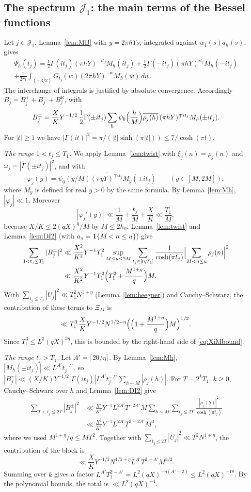 \documentclass[11pt]{amsart}
\theoremstyle{remark}
\theoremstyle{definition}
\numberwithin{equation}{section}
\newcommand{\Jc}{\mathcal{J}}
\newcommand{\one}{\mathbf{1}}
\begin{document}
\subsection{The spectrum \texorpdfstring{$\Jc_1$}{J\_1}: the main terms of the Bessel functions}\label{sec:J1main}
Let $j\in\Jc_1$. Lemma~\ref{lem:MB} with $y=2\pi hYs$, integrated against $w_1(s)a_h(s)$, gives
\begin{multline*}
\Psi_h(t_j)=\frac12\Gamma(it_j)(\pi hY)^{-it_j}M_h(it_j)+\frac12\Gamma(-it_j)(\pi hY)^{it_j}M_h(-it_j)\\
+\frac1{2\pi i}\int_{(-3/2)}G_{t_j}(w)(2\pi hY)^{-w}M_h(w)\,dw.
\end{multline*}
The interchange of integrals is justified by absolute convergence. Accordingly $B_j=B_j^++B_j^-+B_j^{\mathrm R}$, with
\[
B_j^\pm=\frac XKY^{-1/2}\,\frac12\Gamma(\pm it_j)\sum_h\psi_0\Bigl(\frac hM\Bigr)\overline{\rho_j(h)}\,(\pi hY)^{\mp it_j}M_h(\pm it_j).
\]
For $|t|\ge1$ we have $|\Gamma(it)|^2=\pi/(|t|\sinh(\pi|t|))\le7/\cosh(\pi t)$.

\emph{The range $1<t_j\le T_1$.} We apply Lemma~\ref{lem:twist} with $\xi_j(n)=\rho_j(n)$ and $\omega_j=|\Gamma(\pm it_j)|^2$, and with
\[
\varphi_j(y)=\overline{\psi_0(y/M)(\pi yY)^{\mp it_j}M_y(\pm it_j)}\qquad(y\in[M,2M]),
\]
where $M_y$ is defined for real $y>0$ by the same formula. By Lemma~\ref{lem:Mh}, $|\varphi_j|\ll1$. Moreover
\[
|\varphi_j'(y)|\ll\frac1M+\frac{t_j}{M}+\frac XK\ll\frac{T_1}{M},
\]
because $X/K\le2(qX)^\eta/M$ by $M\le2h_0$. Lemma~\ref{lem:twist} and Lemma~\ref{lem:DI2} (with $a_n=\one\{M<n\le u\}$) give
\begin{align*}
\sum_{1<t_j\le T_1}|B_j^\pm|^2&\ll\frac{X^2}{K^2}Y^{-1}T_1^2\sup_{M\le u\le2M}\sum_{t_j\in[0,T_1]}\frac{1}{\cosh(\pi t_j)}\Bigl|\sum_{M<n\le u}\rho_j(n)\Bigr|^2\\
&\ll\frac{X^2}{K^2}Y^{-1}T_1^2\Bigl(T_1^2+\frac{M^{1+\eta}}q\Bigr)M.
\end{align*}
With $\sum_{t_j\le T_1}|U_j|^2\ll T_1^2N^{1+\eta}$ (Lemma~\ref{lem:heegner}) and Cauchy--Schwarz, the contribution of these terms to $\Xi_M$ is
\[
\ll T_1^3\,\frac XKY^{-1/2}N^{1/2+\eta}\Bigl(\Bigl(1+\frac{M^{1+\eta}}q\Bigr)M\Bigr)^{1/2}.
\]
Since $T_1^3\le L^3(qX)^{3\eta}$, this is bounded by the right-hand side of \eqref{eq:XiMbound}.

\emph{The range $t_j>T_1$.} Let $A'=\lceil20/\eta\rceil$. By Lemma~\ref{lem:Mh}, $|M_h(\pm it_j)|\ll L^{A'}t_j^{-A'}$, so $|B_j^\pm|\ll(X/K)Y^{-1/2}|\Gamma(it_j)|L^{A'}t_j^{-A'}\sum_{h\sim M}|\rho_j(h)|$. For $T=2^kT_1$, $k\ge0$, Cauchy--Schwarz over $h$ and Lemma~\ref{lem:DI2} give
\begin{align*}
\sum_{T<t_j\le2T}|B_j^\pm|^2&\ll\frac{X^2}{K^2}Y^{-1}L^{2A'}T^{-2A'}M\sum_{h\sim M}\sum_{t_j\le2T}\frac{|\rho_j(h)|^2}{\cosh(\pi t_j)}\\
&\ll\frac{X^2}{K^2}Y^{-1}L^{2A'}T^{2-2A'}M^{3},
\end{align*}
where we used $M^{1+\eta}/q\le MT^2$. Together with $\sum_{t_j\le2T}|U_j|^2\ll T^2N^{1+\eta}$, the contribution of the block is
\[
\ll\frac XKY^{-1/2}N^{1/2+\eta}L^{A'}T^{2-A'}M^{3/2}.
\]
Summing over $k$ gives a factor $L^{A'}T_1^{2-A'}=L^2(qX)^{-\eta(A'-2)}\le L^2(qX)^{-18}$. By the polynomial bounds, the total is $\ll L^2(qX)^{-4}$.
\end{document}
